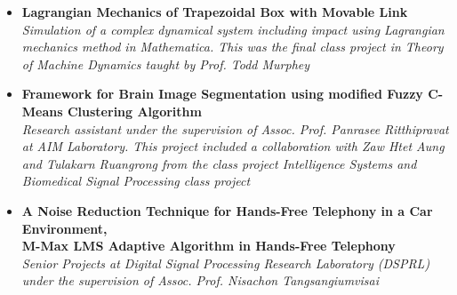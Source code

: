 \begin{itemize}[leftmargin=0cm, label={}]
\item {\bf Lagrangian Mechanics of Trapezoidal Box with Movable Link}\\
{\em Simulation of a complex dynamical system including impact using Lagrangian mechanics method in Mathematica. This was the final class project in Theory of Machine Dynamics taught by Prof. Todd Murphey }

\item {\bf Framework for Brain Image Segmentation using modified Fuzzy C-Means Clustering Algorithm}\\
{\em Research assistant under the supervision of Assoc. Prof. Panrasee Ritthipravat at AIM Laboratory. This project included a collaboration with Zaw Htet Aung and Tulakarn Ruangrong from the class project Intelligence Systems and Biomedical Signal Processing class project}

\item {\bf A Noise Reduction Technique for Hands-Free Telephony in a Car Environment, } \\
{\bf M-Max LMS Adaptive Algorithm in Hands-Free Telephony}\\
{\em Senior Projects at Digital Signal Processing Research Laboratory (DSPRL) under the supervision of Assoc. Prof. Nisachon Tangsangiumvisai}

\end{itemize}
